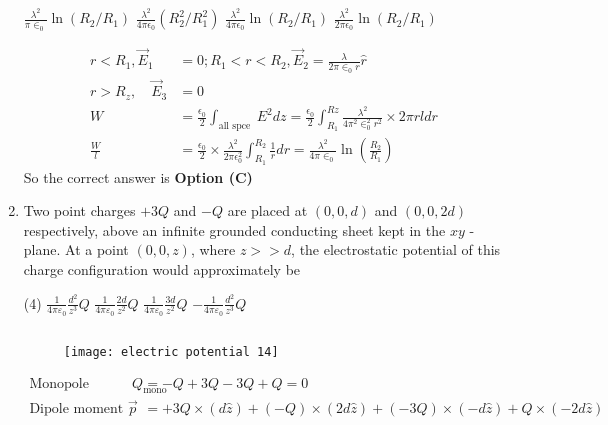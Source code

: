 \begin{enumerate}
\begin{tasks}
		\task[\textbf{A.}] $\frac{\lambda^{2}}{\pi \in_{0}} \ln \left(R_{2} / R_{1}\right)$
		\task[\textbf{B.}] $\frac{\lambda^{2}}{4 \pi \epsilon_{0}}\left(R_{2}^{2} / R_{1}^{2}\right)$
		\task[\textbf{C.}] $\frac{\lambda^{2}}{4 \pi \epsilon_{0}} \ln \left(R_{2} / R_{1}\right)$
		\task[\textbf{D.}] $\frac{\lambda^{2}}{2 \pi \epsilon_{0}} \ln \left(R_{2} / R_{1}\right)$
	\end{tasks}
	\begin{answer}
		\begin{align*}
		r<R_{1}, \vec{E}_{1}&=0 ; R_{1}<r<R_{2}, \vec{E}_{2}=\frac{\lambda}{2 \pi \in_{0} r} \hat{r}\\
		r>R_{z}, \quad \vec{E}_{3}&=0\\
		W&=\frac{\epsilon_{0}}{2} \int_{\text {all spce }}{E^{2} d z}=\frac{\epsilon_{0}}{2} \int_{R_{1}}^{R z} \frac{\lambda^{2}}{4 \pi^{2} \in_{0}^{2} r^{2}} \times 2 \pi r l d r\\
		\frac{W}{l}&=\frac{\epsilon_{0}}{2} \times \frac{\lambda^{2}}{2 \pi \epsilon_{0}^{2}} \int_{R_{1}}^{R_{2}} \frac{1}{r} d r=\frac{\lambda^{2}}{4 \pi \in_{0}} \ln \left(\frac{R_{2}}{R_{1}}\right)
		\end{align*}
		So the correct answer is \textbf{Option (C)}
	\end{answer}
	\item Two point charges $+3 Q$ and $-Q$ are placed at $(0,0, d)$ and $(0,0,2 d)$ respectively, above an infinite grounded conducting sheet kept in the $x y$ - plane. At a point $(0,0, z)$, where $z>>d$, the electrostatic potential of this charge configuration would approximately be
	{}
	\begin{tasks}(4)
		\task[\textbf{A.}] $\frac{1}{4 \pi \varepsilon_{0}} \frac{d^{2}}{z^{3}} Q$
		\task[\textbf{B.}] $\frac{1}{4 \pi \varepsilon_{0}} \frac{2 d}{z^{2}} Q$
		\task[\textbf{C.}] $\frac{1}{4 \pi \varepsilon_{0}} \frac{3 d}{z^{2}} Q$
		\task[\textbf{D.}] $-\frac{1}{4 \pi \varepsilon_{0}} \frac{d^{2}}{z^{3}} Q$
	\end{tasks}
	\begin{answer}$\left. \right. $
		\begin{figure}[H]
			\centering
			\texttt{[image: electric potential 14]}
		\end{figure}
		\begin{align*}
		\text{Monopole moment }Q_{\text {mono }}&=-Q+3 Q-3 Q+Q=0\\
		\text{Dipole moment }\vec{p}&=+3 Q \times(d \hat{z})+(-Q) \times(2 d \hat{z})+(-3 Q) \times(-d \hat{z})+Q \times(-2 d \hat{z})\\

\end{align*}
\end{answer}
\end{enumerate}
